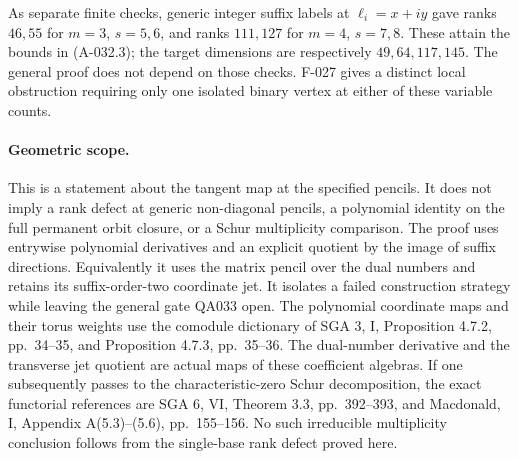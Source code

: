 As separate finite checks, generic integer suffix labels at
\(\ell_i=x+i y\) gave ranks \(46,55\) for \(m=3\),
\(s=5,6\), and ranks \(111,127\) for \(m=4\),
\(s=7,8\). These attain the bounds in (A-032.3); the target
dimensions are respectively \(49,64,117,145\).
The general proof does not depend on those checks.
F-027 gives a distinct local obstruction requiring only
one isolated binary vertex at either of these variable counts.

\paragraph{Geometric scope.}
This is a statement about the tangent map at the specified
pencils. It does not imply a rank defect at generic non-diagonal
pencils, a polynomial identity on the full permanent orbit
closure, or a Schur multiplicity comparison.
The proof uses entrywise polynomial derivatives and an explicit
quotient by the image of suffix directions. Equivalently it
uses the matrix pencil over the dual numbers and retains its
suffix-order-two coordinate jet. It isolates a failed
construction strategy while leaving the general gate QA033 open.
The polynomial coordinate maps and their torus weights use
the comodule dictionary of SGA 3, I, Proposition 4.7.2,
pp.~34--35, and Proposition 4.7.3, pp.~35--36.
The dual-number derivative and the transverse jet quotient
are actual maps of these coefficient algebras. If one
subsequently passes to the characteristic-zero Schur
decomposition, the exact functorial references are
SGA 6, VI, Theorem 3.3, pp.~392--393, and Macdonald,
I, Appendix A(5.3)--(5.6), pp.~155--156.
No such irreducible multiplicity conclusion follows
from the single-base rank defect proved here.
